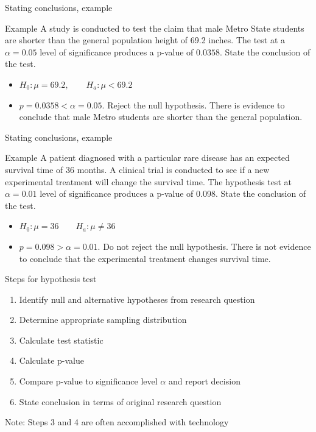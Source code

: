 \documentclass[xcolor=table]{beamer}
\begin{document}
\begin{frame}{Stating conclusions, example}
\begin{exampleblock}{Example}
\large
A study is conducted to test the claim that male Metro State students are shorter than the general population height of 69.2 inches. The test at a $\alpha=0.05$ level of significance produces a p-value of $0.0358$. State the conclusion of the test.
\begin{itemize}
\pause\item $H_0: \mu=69.2, \qquad H_a: \mu < 69.2$
\pause\item $p=0.0358 < \alpha = 0.05$. Reject the null hypothesis. There is evidence to conclude that male Metro students are shorter than the general population.
\end{itemize}
\end{exampleblock}
\end{frame}

\begin{frame}{Stating conclusions, example}
\begin{exampleblock}{Example}
\large
A patient diagnosed with a particular rare disease has an expected survival time of 36 months. A clinical trial is conducted to see if a new experimental treatment will change the survival time. The hypothesis test at $\alpha = 0.01$ level of significance produces a p-value of 0.098. State the conclusion of the test.
\begin{itemize}
\pause\item $H_0: \mu = 36 \qquad H_a: \mu \ne 36$
\pause\item $p=0.098 > \alpha = 0.01$. Do not reject the null hypothesis. There is not evidence to conclude that the experimental treatment changes survival time.
\end{itemize}\end{exampleblock}
\end{frame}

\begin{frame}{Steps for hypothesis test}
\begin{block}{}
\large
\begin{enumerate}
\item Identify null and alternative hypotheses from research question
\item Determine appropriate sampling distribution
\item Calculate test statistic
\item Calculate p-value
\item Compare p-value to significance level $\alpha$ and report decision
\item State conclusion in terms of original research question
\end{enumerate}
Note: Steps 3 and 4 are often accomplished with technology
\end{block}
\end{frame}
\end{document}
